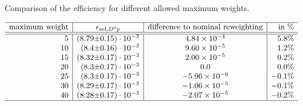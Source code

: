  
\begin{table}[hptb]
    \centering
    \caption{Comparison of the efficiency \effSelDp for different allowed maximum weights.}
    \label{tab:systematic_effD0p_maxweight}
    $\begin{array}{r|r@{\pm}l|c|r}
    \hline
    \text{maximum weight}  & \multicolumn{2}{c|}{\effSelDp}  & \text{difference to nominal reweighting} & \text{in \%} \\ \hline \hline
5 & (8.79 & 0.15) \cdot 10^{-3} & \num[round-mode=figures, round-precision=3]{0.000483640507719} & 5.8\%\\ 10 & (8.4 & 0.16) \cdot 10^{-3} & \num[round-mode=figures, round-precision=3]{9.60100390259e-05} & 1.2\%\\ 15 & (8.32 & 0.17) \cdot 10^{-3} & \num[round-mode=figures, round-precision=3]{2.00375500349e-05} & 0.2\%\\ 20 & (8.3 & 0.17) \cdot 10^{-3} & \num[round-mode=figures, round-precision=3]{0.0} & 0.0\%\\ 25 & (8.3 & 0.17) \cdot 10^{-3} & \num[round-mode=figures, round-precision=3]{-5.95559256641e-06} & -0.1\%\\ 30 & (8.29 & 0.17) \cdot 10^{-3} & \num[round-mode=figures, round-precision=3]{-1.05520925512e-05} & -0.1\%\\ 40 & (8.28 & 0.17) \cdot 10^{-3} & \num[round-mode=figures, round-precision=3]{-2.06929754863e-05} & -0.2\%\\ 
    \hline
    \end{array}$
\end{table}
